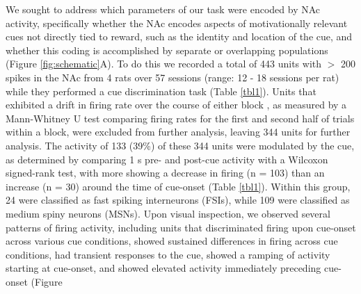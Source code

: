 \documentclass[11pt]{article}
\providecommand{\DIFadd}[1]{{\protect\color{red} \sf #1}} %
\providecommand{\DIFdel}[1]{} %
\providecommand{\DIFaddbegin}{} %
\providecommand{\DIFaddend}{} %
\providecommand{\DIFdelbegin}{} %
\providecommand{\DIFdelend}{} %
\newcommand{\DIFscaledelfig}{0.5}
\newlength{\DIFdelgraphicswidth} %
\newlength{\DIFdelgraphicsheight} %
\newcommand{\DIFaddincludegraphics}[2][]{{\color{red}\fbox{\DIFOincludegraphics[#1]{#2}}}} %
\newcommand{\DIFdelincludegraphics}[2][]{%
\sbox{\DIFdelgraphicsbox}{\DIFOincludegraphics[#1]{#2}}%
\settoboxwidth{\DIFdelgraphicswidth}{\DIFdelgraphicsbox} %
\settoboxtotalheight{\DIFdelgraphicsheight}{\DIFdelgraphicsbox} %
\scalebox{\DIFscaledelfig}{%
\parbox[b]{\DIFdelgraphicswidth}{\usebox{\DIFdelgraphicsbox}\\[-\baselineskip] \rule{\DIFdelgraphicswidth}{0em}}\llap{\resizebox{\DIFdelgraphicswidth}{\DIFdelgraphicsheight}{%
\setlength{\unitlength}{\DIFdelgraphicswidth}%
\begin{picture}(1,1)%
\thicklines\linethickness{2pt} %
{\color[rgb]{1,0,0}\put(0,0){\framebox(1,1){}}}%
{\color[rgb]{1,0,0}\put(0,0){\line( 1,1){1}}}%
{\color[rgb]{1,0,0}\put(0,1){\line(1,-1){1}}}%
\end{picture}%
}\hspace*{3pt}}} %
} %
\DeclareRobustCommand{\DIFaddbegin}{\DIFOaddbegin \let\includegraphics\DIFaddincludegraphics} %
\DeclareRobustCommand{\DIFaddend}{\DIFOaddend \let\includegraphics\DIFOincludegraphics} %
\DeclareRobustCommand{\DIFdelbegin}{\DIFOdelbegin \let\includegraphics\DIFdelincludegraphics} %
\DeclareRobustCommand{\DIFdelend}{\DIFOaddend \let\includegraphics\DIFOincludegraphics} %
\begin{document}
\DIFdelbegin %
\DIFdel{Single unit responses discriminate cue features:}%

\DIFdelend We sought to address which parameters of our task were encoded by NAc
activity, specifically whether the NAc encodes aspects of
motivationally relevant cues not directly tied to reward, such as the
identity and location of the cue, and whether this coding is
\DIFdelbegin \DIFdel{independent or integrated with coding of cue outcome}\DIFdelend \DIFaddbegin \DIFadd{accomplished by separate or overlapping populations (Figure
\ref{fig:schematic}A)}\DIFaddend . To do this we recorded a total of 443 units
with $>$ 200 spikes in the NAc from 4 rats over 57 sessions (range: 12
- 18 sessions per rat) while they performed a cue discrimination task
(Table \ref{tbl1}). Units that exhibited a drift in firing rate over
the course of either block\DIFaddbegin \DIFadd{, as measured by a Mann-Whitney U test comparing
firing rates for the first and second half of trials within a block,
}\DIFaddend were excluded from further analysis, leaving 344 units for further
analysis. The activity of 133 (39\%) of these 344 units were modulated
by the cue, \DIFdelbegin \DIFdel{with }\DIFdelend \DIFaddbegin \DIFadd{as determined by comparing 1 s pre- and post-cue activity with a Wilcoxon signed-rank test, with }\DIFaddend more showing a decrease in firing (n = 103) than an
increase (n = 30) around the time of cue-onset (Table
\ref{tbl1}). Within this group, 24 were classified as \DIFdelbegin \DIFdel{FSIs}\DIFdelend \DIFaddbegin \DIFadd{fast spiking interneurons (FSIs)}\DIFaddend , while 109
were classified as \DIFdelbegin \DIFdel{SPNs}\DIFdelend \DIFaddbegin \DIFadd{medium spiny neurons (MSNs)}\DIFaddend . Upon visual inspection, we observed several
patterns of firing activity, including units that discriminated firing
upon cue-onset across various cue conditions, showed sustained
differences in firing across cue conditions, had transient responses
to the cue, showed a ramping of activity starting at cue-onset, and
showed elevated activity immediately preceding cue-onset \DIFdelbegin \DIFdel{, for example }\DIFdelend (Figure
\end{document}
